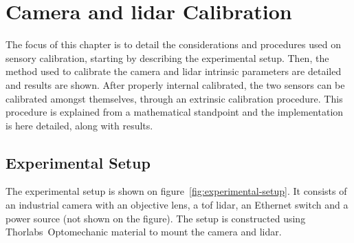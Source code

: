 \chapter{Camera and \acs{lidar} Calibration}
\label{chapter:calibration}

The focus of this chapter is to detail the considerations and procedures used on sensory calibration, starting by describing the experimental setup. Then, the method used to calibrate the camera and \ac{lidar} intrinsic parameters are detailed and results are shown. After properly internal calibrated, the two sensors can be calibrated amongst themselves, through an extrinsic calibration procedure. This procedure is explained from a mathematical standpoint and the implementation is here detailed, along with results.


\section{Experimental Setup}
\label{sec:calibration:experimental-setup}
The experimental setup is shown on figure~\ref{fig:experimental-setup}. It consists of an industrial camera with an objective lens, a \ac{tof} \ac{lidar}, an Ethernet switch and a power source (not shown on the figure). The setup is constructed using Thorlabs\cp~Optomechanic material to mount the camera and \ac{lidar}.

